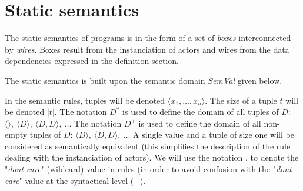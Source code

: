 
\chapter{Static semantics}
\label{chap:static}

 \newcommand{\semwild}{.}


The static semantics of \caph programs is in the form of a set of \emph{boxes} interconnected by
\emph{wires}. Boxes result from the instanciation of actors and wires from the data
dependencies expressed in the definition section.

\medskip
The static semantics is built upon the semantic domain \emph{SemVal} given below.

In the semantic rules, tuples will be denoted $\langle x_1, \ldots, x_n \rangle$.  The size of a
tuple $t$ will be denoted $|t|$.  
The notation $D^*$ is used to define the domain of all tuples of $D$:
$\langle\rangle,~ \langle D\rangle,~ \langle D,D \rangle,~ \ldots$
The notation $D^+$ is used to define the domain of all non-empty tuples of $D$:
$\langle D\rangle,~ \langle D,D \rangle,~ \ldots$
A single value and a tuple of size one will be considered as semantically equivalent (this
simplifies the description of the rule dealing with the instanciation of actors).
We will use the notation $.$ to denote the "\emph{dont care}" (wildcard)
value in rules (in order to avoid confusion with the "\emph{dont care}" value at the syntactical level (\_).

